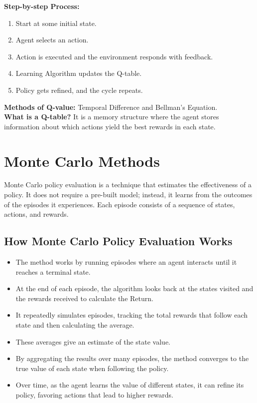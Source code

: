 \documentclass[12pt]{article}
\begin{document}
\textbf{Step-by-step Process:}
\begin{enumerate}
    \item Start at some initial state.
    \item Agent selects an action.
    \item Action is executed and the environment responds with feedback.
    \item Learning Algorithm updates the Q-table.
    \item Policy gets refined, and the cycle repeats.
\end{enumerate}

\textbf{Methods of Q-value:} Temporal Difference and Bellman's Equation.\\
\textbf{What is a Q-table?} It is a memory structure where the agent stores information about which actions yield the best rewards in each state.


\section{Monte Carlo Methods}

Monte Carlo policy evaluation is a technique that estimates the effectiveness of a policy. It does not require a pre-built model; instead, it learns from the outcomes of the episodes it experiences. Each episode consists of a sequence of states, actions, and rewards.

\subsection{How Monte Carlo Policy Evaluation Works}
\begin{itemize}
    \item The method works by running episodes where an agent interacts until it reaches a terminal state.
    \item At the end of each episode, the algorithm looks back at the states visited and the rewards received to calculate the Return.
    \item It repeatedly simulates episodes, tracking the total rewards that follow each state and then calculating the average.
    \item These averages give an estimate of the state value.
    \item By aggregating the results over many episodes, the method converges to the true value of each state when following the policy.
    \item Over time, as the agent learns the value of different states, it can refine its policy, favoring actions that lead to higher rewards.
\end{itemize}
\end{document}
